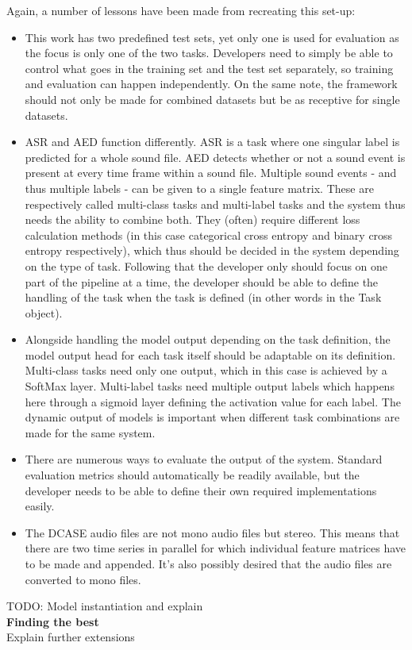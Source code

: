 Again, a number of lessons have been made from recreating this set-up:

\begin{itemize}
	\item This work has two predefined test sets, yet only one is used for evaluation as the focus is only one of the two tasks. Developers need to simply be able to control what goes in the training set and the test set separately, so training and evaluation can happen independently. On the same note, the framework should not only be made for combined datasets but be as receptive for single datasets.
	\item ASR and AED function differently. ASR is a task where one singular label is predicted for a whole sound file. AED detects whether or not a sound event is present at every time frame within a sound file. Multiple sound events - and thus multiple labels - can be given to a single feature matrix. These are respectively called multi-class tasks and multi-label tasks and the system thus needs the ability to combine both. They (often) require different loss calculation methods (in this case categorical cross entropy and binary cross entropy respectively), which thus should be decided in the system depending on the type of task. Following that the developer only should focus on one part of the pipeline at a time, the developer should be able to define the handling of the task when the task is defined (in other words in the Task object).
	\item Alongside handling the model output depending on the task definition, the model output head for each task itself should be adaptable on its definition. Multi-class tasks need only one output, which in this case is achieved by a SoftMax layer. Multi-label  tasks need multiple output labels which happens here through a sigmoid layer defining the activation value for each label. The dynamic output of models is important when different task combinations are made for the same system.
	\item There are numerous ways to evaluate the output of the system. Standard evaluation metrics should automatically be readily available, but the developer needs to be able to define their own required implementations easily. 
	\item The DCASE audio files are not mono audio files but stereo. This means that there are two time series in parallel for which individual feature matrices have to be made and appended. It's also possibly desired that the audio files are converted to mono files.
\end{itemize}

TODO: Model instantiation and explain \\

{\large \textbf{Finding the best }}\\







Explain further extensions


